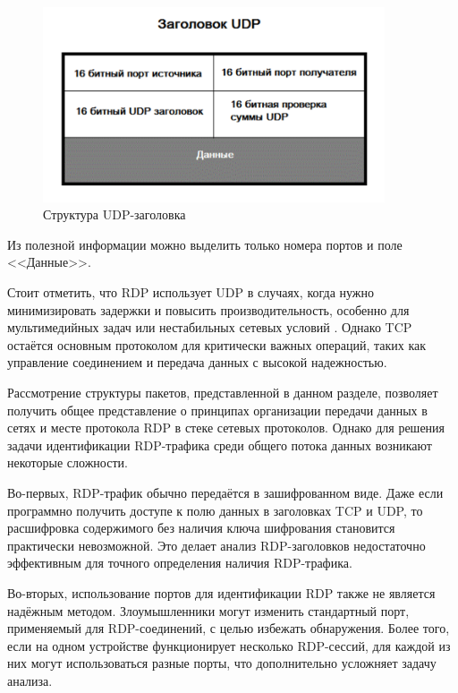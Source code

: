 \documentclass[bachelor, och, coursework]{SCWorks}
\begin{document}
\begin{figure}[H]
  \centering
  \includegraphics[width=0.9\textwidth]{pics/udp-segment.png}
  \caption{Структура UDP-заголовка}
  \label{udp-header}
\end{figure}

Из полезной информации можно выделить только номера портов и поле <<Данные>>.

Стоит отметить, что RDP использует UDP в случаях, когда нужно минимизировать задержки и повысить производительность, особенно для мультимедийных 
задач или нестабильных сетевых условий \cite{udpseg}. Однако TCP остаётся основным протоколом для критически важных операций, таких как 
управление соединением и передача данных с высокой надежностью.


Рассмотрение структуры пакетов, представленной в данном разделе, позволяет получить общее представление о принципах организации передачи данных в сетях и месте 
протокола RDP в стеке сетевых протоколов. Однако для решения задачи идентификации RDP-трафика среди общего потока данных возникают некоторые сложности.

Во-первых, RDP-трафик обычно передаётся в зашифрованном виде. Даже если программно получить доступе к полю данных в заголовках TCP и UDP, то расшифровка 
содержимого без наличия ключа шифрования становится практически невозможной. Это делает анализ RDP-заголовков недостаточно эффективным для точного 
определения наличия RDP-трафика.

Во-вторых, использование портов для идентификации RDP также не является надёжным методом. Злоумышленники могут изменить стандартный порт, 
применяемый для RDP-соединений, с целью избежать обнаружения. Более того, если на одном устройстве функционирует несколько RDP-сессий, для каждой 
из них могут использоваться разные порты, что дополнительно усложняет задачу анализа.
\end{document}
